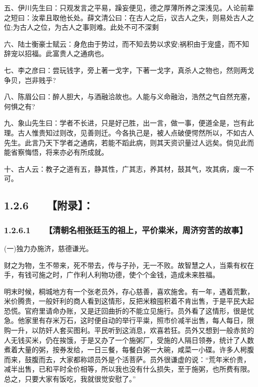 \documentclass[letterpaper,12pt,english]{sphinxmanual}
\begin{document}
五、伊川先生曰：只观发言之平易，躁妄便见，德之厚薄所养之深浅见。人论前辈之短曰：汝辈且取他长处。薛文清公曰：在古人之后，议古人之失，则易处古人之位;为古人之位，为古人之事则难。此处不可不深剩

六、陆士衡豪士赋云：身危由于势过，而不知去势以求安;祸积由于宠盛，而不知辞宠以招福。此富贵人之通病也。

七、李之彦曰：尝玩钱字，旁上著一戈字，下著一戈字，真杀人之物也，然则两戈争贝，岂非贱乎?

八、陈眉公曰：醉人胆大，与酒融洽故也。人能与义命融治，浩然之气自然充塞，何惧之有?

九、象山先生曰：学者不长进，只是好己胜，出一言，做一事，便道全是，岂有此理。古人惟贵知过则改，见善则迁。今各执己是，被人点破便愕然所以，不如古人先生。此言乃天下学者之通病，若能不蹈此病，则其天资识量过人远矣。倘见此而能省察悔悟，将来亦必有所成就。

十、古人云：教子之道有五，静其性，广其志，养其材，鼓其气，攻其病，废一不可。


\subsection{1.2.6   【附录】：}
\label{\detokenize{p00_u5176_u5b83/_u300a_u5f20_u82f1-_u806a_u8bad_u658b_u8bed_u300b_u300a_u5f20_u5ef7_u7389-_u6f84_u6000_u56ed_u8bed_u300b_u5408_u8f91:id13}}

\subsubsection{1.2.6.1   【清朝名相张廷玉的祖上，平价粜米，周济穷苦的故事】}
\label{\detokenize{p00_u5176_u5b83/_u300a_u5f20_u82f1-_u806a_u8bad_u658b_u8bed_u300b_u300a_u5f20_u5ef7_u7389-_u6f84_u6000_u56ed_u8bed_u300b_u5408_u8f91:id14}}
(一)独力办施济，慈德谦光。

财之为物，生不带来，死不带去，传与子孙，无一不败。故智慧之人，当乘有权在手，有钱可施之时，广作利人利物功德，使个个金钱，造成未来胜福。

明末时候，桐城地方有一个张老员外，存心慈善，喜欢施舍。有一年，遇着荒歉，米价腾贵，一般奸利的商人看到这情形，反把米粮囤积着不肯出售，于是平民大起恐慌。官府里请命办账，又是迂回曲折的不能立见施行。员外看了这情形，很是忧急。他家里有存米万石，这时便自动的举行平粜，照市价减半出售，每人每日，限购一升，以防奸人套买图利。平民听到这消息，欢喜若狂。员外又想到一般赤贫的人无钱买米，仍在挨饿，于是又办了一个施粥厂，受施的人隔日领券，统计了人数煮着大量的粥，按券发给，一日三餐，每餐白粥一大碗，咸菜一小碟。许多人枵腹而来，鼓腹而去，大家都称颂员外是个活菩萨。员外很谦虚的说：“荒年米价贵，减半出售，已和平时全价相等，所以我也没有什么损失，至于施粥，也所费有限。总之，只要大家有饭吃，我就很觉安慰了。”
\end{document}
